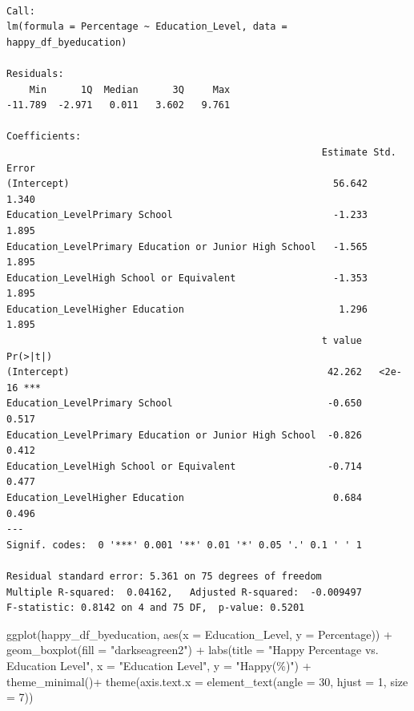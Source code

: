 \documentclass[
  11pt,
  a4paper,
  DIV=11,
  numbers=noendperiod]{scrartcl}
\newenvironment{Shaded}{\begin{snugshade}}{\end{snugshade}}
\newcommand{\AttributeTok}[1]{\textcolor[rgb]{0.40,0.45,0.13}{#1}}
\newcommand{\DecValTok}[1]{\textcolor[rgb]{0.68,0.00,0.00}{#1}}
\newcommand{\FunctionTok}[1]{\textcolor[rgb]{0.28,0.35,0.67}{#1}}
\newcommand{\NormalTok}[1]{\textcolor[rgb]{0.00,0.23,0.31}{#1}}
\newcommand{\SpecialCharTok}[1]{\textcolor[rgb]{0.37,0.37,0.37}{#1}}
\newcommand{\StringTok}[1]{\textcolor[rgb]{0.13,0.47,0.30}{#1}}
\begin{document}
\begin{verbatim}

Call:
lm(formula = Percentage ~ Education_Level, data = happy_df_byeducation)

Residuals:
    Min      1Q  Median      3Q     Max 
-11.789  -2.971   0.011   3.602   9.761 

Coefficients:
                                                       Estimate Std. Error
(Intercept)                                              56.642      1.340
Education_LevelPrimary School                            -1.233      1.895
Education_LevelPrimary Education or Junior High School   -1.565      1.895
Education_LevelHigh School or Equivalent                 -1.353      1.895
Education_LevelHigher Education                           1.296      1.895
                                                       t value Pr(>|t|)    
(Intercept)                                             42.262   <2e-16 ***
Education_LevelPrimary School                           -0.650    0.517    
Education_LevelPrimary Education or Junior High School  -0.826    0.412    
Education_LevelHigh School or Equivalent                -0.714    0.477    
Education_LevelHigher Education                          0.684    0.496    
---
Signif. codes:  0 '***' 0.001 '**' 0.01 '*' 0.05 '.' 0.1 ' ' 1

Residual standard error: 5.361 on 75 degrees of freedom
Multiple R-squared:  0.04162,   Adjusted R-squared:  -0.009497 
F-statistic: 0.8142 on 4 and 75 DF,  p-value: 0.5201
\end{verbatim}

\begin{Shaded}
\begin{Highlighting}[]
\FunctionTok{ggplot}\NormalTok{(happy\_df\_byeducation, }\FunctionTok{aes}\NormalTok{(}\AttributeTok{x =}\NormalTok{ Education\_Level, }\AttributeTok{y =}\NormalTok{ Percentage)) }\SpecialCharTok{+}
  \FunctionTok{geom\_boxplot}\NormalTok{(}\AttributeTok{fill =} \StringTok{"darkseagreen2"}\NormalTok{) }\SpecialCharTok{+}
  \FunctionTok{labs}\NormalTok{(}\AttributeTok{title =} \StringTok{"Happy Percentage vs. Education Level"}\NormalTok{,}
       \AttributeTok{x =} \StringTok{"Education Level"}\NormalTok{, }\AttributeTok{y =} \StringTok{"Happy(\%)"}\NormalTok{) }\SpecialCharTok{+}
  \FunctionTok{theme\_minimal}\NormalTok{()}\SpecialCharTok{+}
  \FunctionTok{theme}\NormalTok{(}\AttributeTok{axis.text.x =} \FunctionTok{element\_text}\NormalTok{(}\AttributeTok{angle =} \DecValTok{30}\NormalTok{, }\AttributeTok{hjust =} \DecValTok{1}\NormalTok{, }\AttributeTok{size =} \DecValTok{7}\NormalTok{))}
\end{Highlighting}
\end{Shaded}
\end{document}
